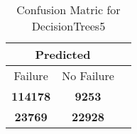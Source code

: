 \begin{table}[] 
\caption{Confusion Matric for DecisionTrees5} 
\label{Table: Prediction Accuracy-DMDDecisionTrees5OnlySunEKF-resetReflection-Reflection} 
\centering 
\begin{tabular} 
 {@{}ccc@{}} 
\toprule 
\multicolumn{2}{c}{\textbf{Predicted}}
 \\ \midrule 
\multicolumn{1}{|c|}{Failure} & 
\multicolumn{1}{c|}{No Failure}
 \\ \midrule 
\multicolumn{1}{|c|}{\color{green}\textbf{114178}} & 
\multicolumn{1}{c|}{\color{red}\textbf{9253}}
 \\ \midrule 
\multicolumn{1}{|c|}{\color{red}\textbf{23769}} & 
\multicolumn{1}{c|}{\color{green}\textbf{22928}}
 \\ \bottomrule 
\end{tabular} 
\end{table} 
